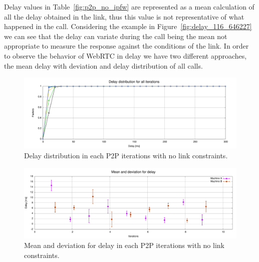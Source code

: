 Delay values in Table~\ref{fig:p2p_no_ipfw} are represented as a mean calculation of all the delay obtained in the link, thus this value is not representative of what happened in the call. Considering the example in Figure~\ref{fig:delay_116_646227} we can see that the delay can variate during the call being the mean not appropriate to measure the response against the conditions of the link. In order to observe the behavior of WebRTC in delay we have two different approaches, the mean delay with deviation and delay distribution of all calls. 

 \begin{figure}[h]
  \centering
    \includegraphics[width=1\textwidth]{./figures/total_delay_distribution_no_ipfw.pdf}
      \caption[Delay distribution in each P2P iterations with no link constraints]{Delay distribution in each P2P iterations with no link constraints.}
	\label{fig:total_delay_distribution_no_ipfw}
\end{figure}

 \begin{figure}[h]
  \centering
    \includegraphics[width=1\textwidth]{./figures/mean_deviation_delay_no_ipfw.pdf}
      \caption[Bandwidth mean and deviation for delay in each P2P iterations with no link constraints]{Mean and deviation for delay in each P2P iterations with no link constraints.}
	\label{fig:mean_deviation_delay_no_ipfw}
\end{figure}

